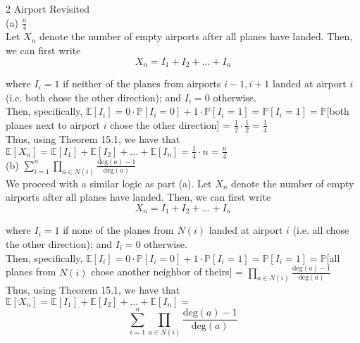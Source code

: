 \documentclass{article}
\begin{document}
{\Large 2 Airport Revisited} \\[.5cm]
{\color{red} (a) $\frac{n}{4}$ } \\

Let $X_n$ denote the number of empty airports after all planes have landed. Then, we can first write $$X_n = I_1 + I_2 + \dots + I_n$$

where $I_i = 1$ if neither of the planes from airports $i-1, i+1$ landed at airport $i$ (i.e. both chose the other direction); and $I_i = 0$ otherwise. \\

Then, specifically, $\mathbb{E}[I_i] = 0\cdot\mathbb{P}[I_i=0] + 1\cdot\mathbb{P}[I_i=1] = \mathbb{P}[I_i=1] = \mathbb{P}[$both planes next to airport $i$ chose the other direction] = $\frac{1}{2}\cdot \frac{1}{2} = \frac{1}{4}$ \\

Thus, using Theorem 15.1, we have that
$\mathbb{E}[X_n] = \mathbb{E}[I_1] + \mathbb{E}[I_2] + \dots + \mathbb{E}[I_n] = \frac{1}{4}\cdot n = \frac{n}{4}$ \\[.5cm]
{\color{red} (b) $\sum\limits_{i=1}^n \prod\limits_{a\in N(i)} \frac{\text{deg}(a)-1}{\text{deg}(a)}$ } \\

We proceed with a similar logic as part (a). Let $X_n$ denote the number of empty airports after all planes have landed. Then, we can first write $$X_n = I_1 + I_2 + \dots + I_n$$

where $I_i = 1$ if none of the planes from $N(i)$ landed at airport $i$ (i.e. all chose the other direction); and $I_i = 0$ otherwise. \\

Then, specifically, $\mathbb{E}[I_i] = 0\cdot\mathbb{P}[I_i=0] + 1\cdot\mathbb{P}[I_i=1] = \mathbb{P}[I_i=1] = \mathbb{P}[$all planes from $N(i)$ chose another neighbor of theirs] =
$\prod\limits_{a\in N(i)} \frac{\text{deg}(a)-1}{\text{deg}(a)}$ \\

Thus, using Theorem 15.1, we have that
$\mathbb{E}[X_n] = \mathbb{E}[I_1] + \mathbb{E}[I_2] + \dots + \mathbb{E}[I_n] = $
$$\sum\limits_{i=1}^n \prod\limits_{a\in N(i)} \frac{\text{deg}(a)-1}{\text{deg}(a)}$$
\end{document}
